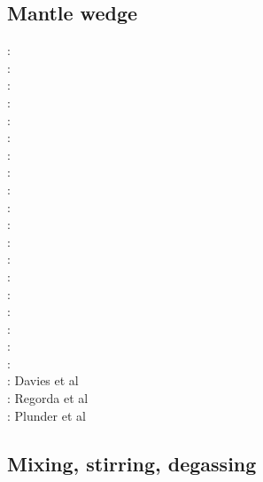 \subsection{Mantle wedge} 

\begin{scriptsize}
\nineteensixtynine: \cite{mcke69}\\
\nineteenseventyone: \cite{tomj71}\\
\nineteenseventyeight: \cite{tosl78}\\
\nineteenseventynine: \cite{bobo79}\\
\nineteeneightyfive: \cite{hond85}\\
\nineteenninetytwo: \cite{dast92}\\
\nineteenninetythree: \cite{furu93}\\
\nineteenninetynine: \cite{pewa99}\\
\twothousandone: \cite{bigu01}\cite{haki01}\\
\twothousandtwo: \cite{vakp02}\\
\twothousandthree: \cite{vank03}\\
\twothousandfour: \cite{enwi04}\\
\twothousandsix: \cite{gogc06}\cite{gecy06}\\
\twothousandseven: \cite{gogc07}\cite{knvk07}\cite{lohd07}\\
\twothousandeight: \cite{knva08}\cite{cage08}\cite{vack08}\\
\twothousandnine: \cite{leki09}\cite{heaa09}\\
\twothousandten: \cite{roms10}\cite{hogz10}\cite{syab06}\\
\twothousandeleven: \cite{zhgh11}\\
\twothousandfourteen: \cite{ledg14}\cite{mabv14}\\
\twothousandsixteen: Davies et al \cite{dalg16} \\
\twothousandseventeen: Regorda et al \cite{rerm17}\\
\twothousandeighteen: Plunder et al \cite{pltv18}
\end{scriptsize}

\subsection{Mixing, stirring, degassing} 

